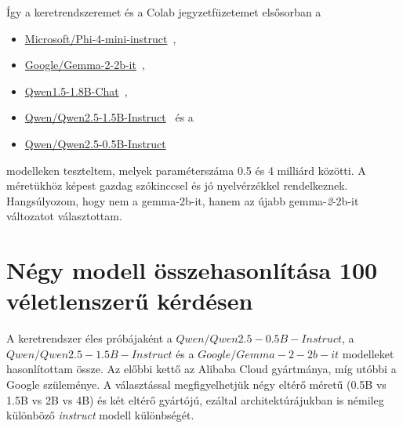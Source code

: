 \documentclass[12pt]{report}
\begin{document}

    Így a keretrendszeremet és a Colab jegyzetfüzetemet elsősorban a
    \begin{itemize}
        \item \href{https://huggingface.co/microsoft/Phi-4-mini-instruct}{Microsoft/Phi-4-mini-instruct}~\cite{phi4mini2024},
        \item \href{https://huggingface.co/google/gemma-2-2b-it}{Google/Gemma-2-2b-it}~\cite{gemma22b2024},
        \item \href{https://huggingface.co/Qwen/Qwen1.5-1.8B-Chat}{Qwen1.5-1.8B-Chat}~\cite{qwen15chat2024},
        \item \href{https://huggingface.co/Qwen/Qwen2.5-1.5B-Instruct}{Qwen/Qwen2.5-1.5B-Instruct}~\cite{qwen2.5} és a
        \item \href{https://huggingface.co/Qwen/Qwen2.5-0.5B-Instruct}{Qwen/Qwen2.5-0.5B-Instruct}~\cite{qwen2.5}
    \end{itemize}
    modelleken teszteltem, melyek paraméterszáma 0.5 és 4 milliárd közötti.
    A méretükhöz képest gazdag szókinccsel és jó nyelvérzékkel rendelkeznek.
    Hangsúlyozom, hogy nem a {gemma-2b-it}, hanem az újabb {gemma-\textit{2}-2b-it} változatot választottam.

    \section{Négy modell összehasonlítása 100 véletlenszerű kérdésen}
    A keretrendszer éles próbájaként a $Qwen/Qwen2.5-0.5B-Instruct$, a\\ $Qwen/Qwen2.5-1.5B-Instruct$ és a $Google/Gemma-2-2b-it$ modelleket hasonlítottam össze. 
    Az előbbi kettő az Alibaba Cloud gyártmánya, míg utóbbi a Google szüleménye. A választással megfigyelhetjük négy eltérő méretű (0.5B vs 1.5B vs 2B vs 4B) és két eltérő gyártójú, ezáltal architektúrájukban is némileg különböző \textit{instruct} modell különbségét. 
\end{document}
